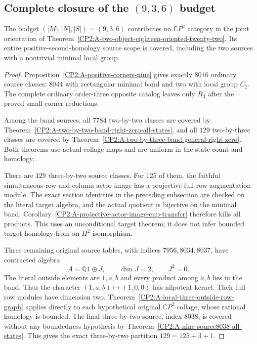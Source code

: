 \subsection{Complete closure of the $(9,3,6)$ budget}

\begin{theorem}
\label{CP2:A-oriented-eighteen-nine-three-six}
The budget $(|M|,|N|,|S|)=(9,3,6)$ contributes no
$\mathbb CP^2$ category in the joint orientation of
Theorem~\ref{CP2:A-two-object-eighteen-oriented-twenty-two}.
Its entire positive-second-homology source scope is covered,
including the two sources with a nontrivial minimal local group.
\end{theorem}
\begin{proof}
Proposition~\ref{CP2:A-positive-corners-nine} gives exactly
$8046$ ordinary source classes: $8044$ with rectangular minimal
band and two with local group $C_2$.  The complete ordinary
order-three opposite catalog leaves only $R_3$ after the
proved small-corner reductions.

Among the band sources, all $7784$ two-by-two classes are
covered by Theorem~\ref{CP2:A-two-by-two-band-right-zero-all-states},
and all $129$ two-by-three classes are covered by
Theorem~\ref{CP2:A-two-by-three-band-general-right-zero}.
Both theorems use actual collage maps and are uniform in
the state count and homology.

There are $129$ three-by-two source classes.  For $125$ of them,
the faithful simultaneous row-and-column actor image has a
projective full row-augmentation module.  The exact section
identities in the preceding subsection are checked on the
literal target algebra, and the actual quotient is bijective
on the minimal band.  Corollary~\ref{CP2:A-projective-actor-image-cup-transfer}
therefore kills all products.  This uses an unconditional
target theorem; it does not infer bounded target homology
from an $H^2$ isomorphism.

Three remaining original source tables, with indices
$7956,8034,8037$, have contracted algebra
\[
 A=\mathbb Q1\oplus J,\qquad \dim J=2,\qquad J^2=0.
\]
The literal outside elements are $1,a,b$ and every product
among $a,b$ lies in the band.  Thus the character
$(1,a,b)\mapsto(1,0,0)$ has nilpotent kernel.
Their full row modules have dimension two.
Theorem~\ref{CP2:A-local-three-outside-row-graph} applies
directly to each hypothetical original $\mathbb CP^2$
collage, whose rational homology is bounded.
The final three-by-two source, index $8038$, is covered
without any boundedness hypothesis by
Theorem~\ref{CP2:A-nine-source8038-all-states}.
This gives the exact three-by-two partition $129=125+3+1$.


\end{proof}
